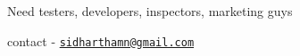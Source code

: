 Need testers, developers, inspectors, marketing guys \par
 contact -\/ \href{mailto:sidharthamn@gmail.com}{\tt sidharthamn@gmail.\-com} 